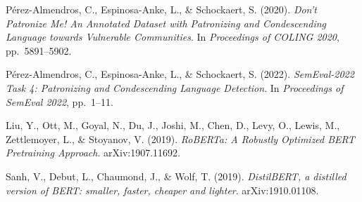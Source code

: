 \documentclass[11pt]{article}
\begin{document}
\begin{enumerate}[label={[\arabic*]}]
    \item Pérez-Almendros, C., Espinosa-Anke, L., \& Schockaert, S. (2020). \textit{Don't Patronize Me! An Annotated Dataset with Patronizing and Condescending Language towards Vulnerable Communities}. In \emph{Proceedings of COLING 2020}, pp.\ 5891--5902.

    \item Pérez-Almendros, C., Espinosa-Anke, L., \& Schockaert, S. (2022). \textit{SemEval-2022 Task 4: Patronizing and Condescending Language Detection}. In \emph{Proceedings of SemEval 2022}, pp.\ 1--11.

    \item Liu, Y., Ott, M., Goyal, N., Du, J., Joshi, M., Chen, D., Levy, O., Lewis, M., Zettlemoyer, L., \& Stoyanov, V. (2019). \textit{RoBERTa: A Robustly Optimized BERT Pretraining Approach}. arXiv:1907.11692.

    \item Sanh, V., Debut, L., Chaumond, J., \& Wolf, T. (2019). \textit{DistilBERT, a distilled version of BERT: smaller, faster, cheaper and lighter}. arXiv:1910.01108.
\end{enumerate}
\end{document}
